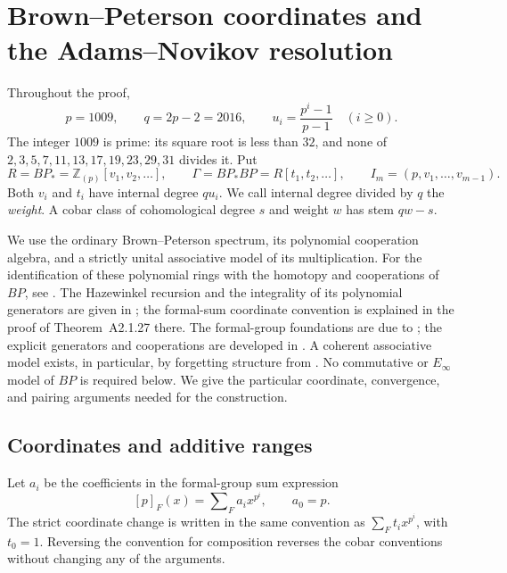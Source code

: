 \section{Brown--Peterson coordinates and the Adams--Novikov resolution}
\label{fw:section}

Throughout the proof,
\begin{equation}
 p=1009,\qquad q=2p-2=2016,\qquad
 u_i=\frac{p^i-1}{p-1}\quad(i\geq 0).
 \label{fw:parameters}
\end{equation}
The integer $1009$ is prime: its square root is less than $32$, and none of
$2,3,5,7,11,13,17,19,23,29,31$ divides it.  Put
\[
 R=BP_* =\mathbb Z_{(p)}[v_1,v_2,\ldots],\qquad
 \Gamma=BP_*BP=R[t_1,t_2,\ldots],\qquad
 I_m=(p,v_1,\ldots,v_{m-1}).
\]
Both $v_i$ and $t_i$ have internal degree $qu_i$.  We call internal degree
divided by $q$ the \emph{weight}.  A cobar class of cohomological degree $s$
and weight $w$ has stem $qw-s$.

We use the ordinary Brown--Peterson spectrum, its polynomial cooperation
algebra, and a strictly unital associative model of its multiplication.
For the identification of these polynomial rings with the homotopy and
cooperations of $BP$, see
\citet[Theorems~4.1.18--4.1.19]{Ravenel2004}. The Hazewinkel recursion
and the integrality of its polynomial generators are given in
\citet[Equation~A2.2.1 and Theorem~A2.2.3]{Ravenel2004}; the formal-sum
coordinate convention is explained in the proof of Theorem~A2.1.27 there.
The formal-group foundations are due to
\citet[Section~5, Theorem~4]{Quillen1969}; the explicit generators and
cooperations are developed in \citet[Sections~3.1 and~4.4]{HazewinkelIII}.
A coherent associative model exists, in particular, by forgetting structure
from \citet[Theorem~1.1]{BasterraMandell2013}.  No commutative or
$E_\infty$ model of $BP$ is required below.  We give the particular coordinate,
convergence, and pairing arguments needed for the construction.

\subsection{Coordinates and additive ranges}

Let $a_i$ be the coefficients in the formal-group sum expression
\[
 [p]_F(x)=\mathop{\sum}\nolimits_F a_i x^{p^i},\qquad a_0=p.
\]
The strict coordinate change is written in the same convention as
$\sum_F t_i x^{p^i}$, with $t_0=1$.  Reversing the convention for composition
reverses the cobar conventions without changing any of the arguments.

